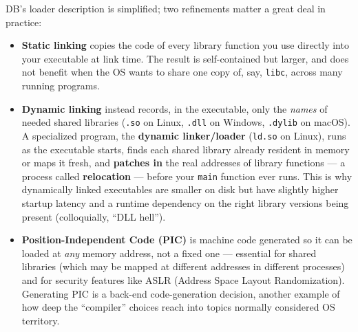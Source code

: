 \documentclass[11pt]{article}
\begin{document}
\begin{enrichment}
DB's loader description is simplified; two refinements matter a great deal in practice:
\begin{itemize}
  \item \textbf{Static linking} copies the code of every library function you use directly into
  your executable at link time. The result is self-contained but larger, and does not benefit
  when the OS wants to share one copy of, say, \texttt{libc}, across many running programs.
  \item \textbf{Dynamic linking} instead records, in the executable, only the \emph{names} of
  needed shared libraries (\texttt{.so} on Linux, \texttt{.dll} on Windows, \texttt{.dylib} on
  macOS). A specialized program, the \textbf{dynamic linker/loader} (\texttt{ld.so} on Linux),
  runs as the executable starts, finds each shared library already resident in memory or maps it
  fresh, and \textbf{patches in} the real addresses of library functions --- a process called
  \textbf{relocation} --- before your \texttt{main} function ever runs. This is why dynamically
  linked executables are smaller on disk but have slightly higher startup latency and a runtime
  dependency on the right library versions being present (colloquially, ``DLL hell'').
  \item \textbf{Position-Independent Code (PIC)} is machine code generated so it can be loaded
  at \emph{any} memory address, not a fixed one --- essential for shared libraries (which may be
  mapped at different addresses in different processes) and for security features like ASLR
  (Address Space Layout Randomization). Generating PIC is a back-end code-generation decision,
  another example of how deep the ``compiler'' choices reach into topics normally considered OS
  territory.
\end{itemize}
\end{enrichment}
\end{document}
